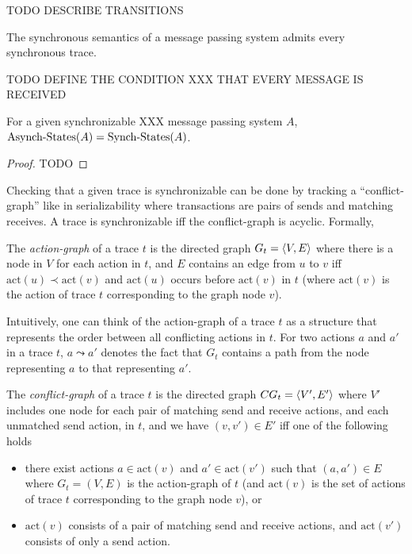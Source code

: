 TODO DESCRIBE TRANSITIONS 

\begin{lemma}\label{lem:sync_traces}
The synchronous semantics of a message passing system admits every synchronous trace.
\end{lemma}

TODO DEFINE THE CONDITION XXX THAT EVERY MESSAGE IS RECEIVED

\begin{lemma}
For a given synchronizable XXX message passing system $A$, $\mathrm{Asynch}\text{-}\mathrm{States}(A)=\mathrm{Synch}\text{-}\mathrm{States}(A)$.
\end{lemma}
\begin{proof}
TODO 
\end{proof}

Checking that a given trace is synchronizable can be done by tracking a ``conflict-graph'' like in serializability 
where transactions are pairs of sends and matching receives. 
A trace is synchronizable if{f} the conflict-graph is acyclic. Formally,

\begin{definition}\label{def:pr_graphs}
    The \emph{action-graph} of a trace $t$ is the directed graph 
    $G_t = \left\langle {V,E} \right\rangle$ where there is a node in $V$ for each action in $t$, and $E$ 
    contains an edge from $u$ to $v$ iff $\mathrm{act}(u) \prec \mathrm{act}(v)$ and $\mathrm{act}(u)$ occurs before $\mathrm{act}(v)$ in $t$ (where $\mathrm{act}(v)$ is the action of trace $t$ corresponding to the graph node $v$).
\end{definition}
Intuitively, one can think of the action-graph of a trace $t$ as a structure that represents the order between all conflicting actions in $t$.
For two actions $a$ and $a'$ in a trace $t$, $a\leadsto a'$ denotes the fact that $G_t$ contains a path from the node representing $a$ to that representing $a'$.

\begin{definition}\label{def:conf_graph}
    The \emph{conflict-graph} of a trace $t$ is the directed graph $CG_t=\left\langle {V',E'} \right\rangle$ where $V'$ includes one node for each pair of matching send and receive actions, and each unmatched send action, in $t$, and we have $(v,v') \in E'$ iff one of the following holds
\begin{itemize}
    	\item there exist actions $a \in \mathrm{act}(v)$ and $a' \in \mathrm{act}(v')$ such that $(a,a') \in E$ where $G_t = (V,E)$ is the action-graph of $t$ (and $\mathrm{act}(v)$ is the set of actions of trace $t$ corresponding to the graph node $v$), or
	\item $\mathrm{act}(v)$ consists of a pair of matching send and receive actions, and $\mathrm{act}(v')$ consists of only a send action.
\end{itemize}
\end{definition}



